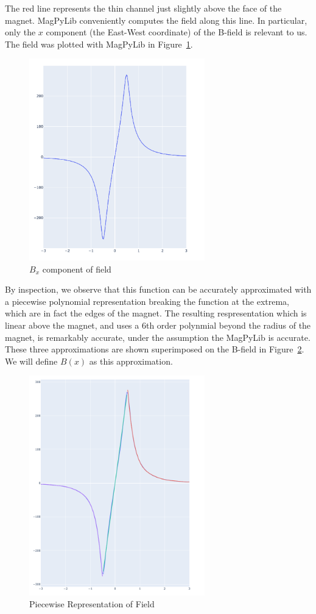 \documentclass[]{asme2ej}
\begin{document}
The red line represents the thin channel just slightly above the face of
the magnet.
MagPyLib conveniently computes the field along this line. In particular,
only the $x$ component (the East-West coordinate) of the B-field is relevant to us.
The field was plotted with MagPyLib in Figure~\ref{fig:Bx}.

\begin{figure}
\centerline{\includegraphics[width=3in]{figure/Bx.png}}
\caption{$B_x$ component of field}
\label{fig:Bx}
\end{figure}

By inspection, we observe that this function can be accurately approximated with
a piecewise polynomial representation breaking the function at the extrema,
which
are in fact the edges of the magnet.
The resulting respresentation which is linear above the magnet,
and uses a 6th order polynmial beyond the radius of the magnet,
is remarkably accurate, under the assumption the MagPyLib is accurate. These
three approximations are shown superimposed on the B-field in Figure~\ref{fig:piecewise}. We will define $B(x)$ as this approximation.

\begin{figure}
\centerline{\includegraphics[width=3in]{figure/PlotOfBxWithPieceWiseInterpolation.png}}
\caption{Piecewise Representation of Field}
\label{fig:piecewise}
\end{figure}
\end{document}
